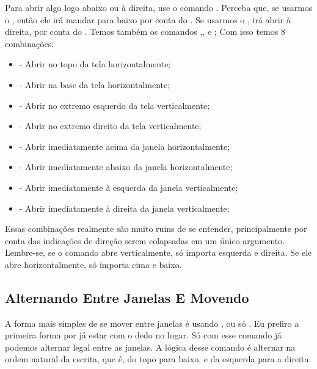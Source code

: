 Para abrir algo logo abaixo ou à direita, use o comando .
Perceba que, se usarmos o , então ele irá mandar para baixo por conta do .
Se usarmos o , irá abrir à direita, por conta do .
Temos também os comandos ,, e ;
Com isso temos 8 combinações:
\vspace{1cm}

\begin{itemize}
    \item {} - Abrir no topo da tela horizontalmente;
    \item {} - Abrir na base da tela horizontalmente;
    \item {} - Abrir no extremo esquerdo da tela verticalmente;
    \item {} - Abrir no extremo direito da tela verticalmente;
    \item {} - Abrir imediatamente acima da janela horizontalmente;
    \item {} - Abrir imediatamente abaixo da janela horizontalmente;
    \item {} - Abrir imediatamente à esquerda da janela verticalmente;
    \item {} - Abrir imediatamente à direita da janela verticalmente;
\end{itemize}


Essas combinações realmente são muito ruins de se entender, principalmente por conta das indicações de direção
serem colapsadas em um único argumento.
Lembre-se, se o comando abre verticalmente, só importa esquerda e direita.
Se ele abre horizontalmente, só importa cima e baixo.


\subsection{Alternando Entre Janelas E Movendo}
A forma mais simples de se mover entre janelas é usando , ou só .
Eu prefiro a primeira forma por já estar com o dedo no lugar.
Só com esse comando já podemos alternar legal entre as janelas. 
A lógica desse comando é alternar na ordem natural da escrita, que é, do topo para baixo, e da esquerda para a direita.

